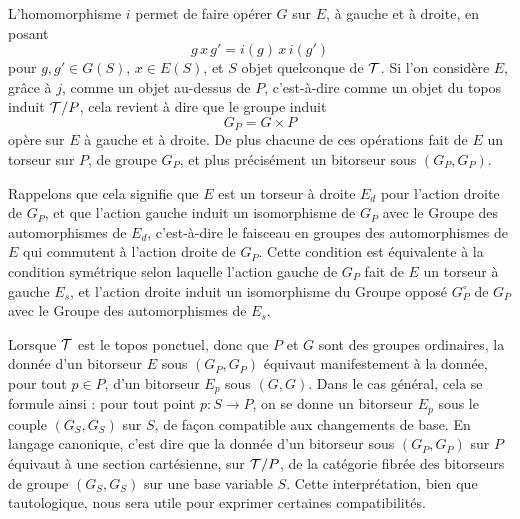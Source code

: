 \documentclass[11pt]{article}
\begin{document}
L'homomorphisme \(i\) permet de faire opérer \(G\) sur \(E\), à gauche et à droite, en posant
\[
  g\,x\,g'=i(g)\,x\,i(g')
\]
pour \(g,g'\in G(S)\), \(x\in E(S)\), et \(S\) objet quelconque de \(\mathcal T\).  Si l'on considère \(E\), grâce à \(j\), comme un objet au-dessus de \(P\), c'est-à-dire comme un objet du topos induit \(\mathcal T/P\), cela revient à dire que le groupe induit
\[
  G_P=G\times P
\]
opère sur \(E\) à gauche et à droite.  De plus chacune de ces opérations fait de \(E\) un torseur sur \(P\), de groupe \(G_P\), et plus précisément un bitorseur sous \((G_P,G_P)\).

Rappelons que cela signifie que \(E\) est un torseur à droite \(E_d\) pour l'action droite de \(G_P\), et que l'action gauche induit un isomorphisme de \(G_P\) avec le Groupe des automorphismes de \(E_d\), c'est-à-dire le faisceau en groupes des automorphismes de \(E\) qui commutent à l'action droite de \(G_P\).  Cette condition est équivalente à la condition symétrique selon laquelle l'action gauche de \(G_P\) fait de \(E\) un torseur à gauche \(E_s\), et l'action droite induit un isomorphisme du Groupe opposé \(G_P^\circ\) de \(G_P\) avec le Groupe des automorphismes de \(E_s\).

Lorsque \(\mathcal T\) est le topos ponctuel, donc que \(P\) et \(G\) sont des groupes ordinaires, la donnée d'un bitorseur \(E\) sous \((G_P,G_P)\) équivaut manifestement à la donnée, pour tout \(p\in P\), d'un bitorseur \(E_p\) sous \((G,G)\).  Dans le cas général, cela se formule ainsi : pour tout point \(p:S\to P\), on se donne un bitorseur \(E_p\) sous le couple \((G_S,G_S)\) sur \(S\), de façon compatible aux changements de base.  En langage canonique, c'est dire que la donnée d'un bitorseur sous \((G_P,G_P)\) sur \(P\) équivaut à une section cartésienne, sur \(\mathcal T/P\), de la catégorie fibrée des bitorseurs de groupe \((G_S,G_S)\) sur une base variable \(S\).  Cette interprétation, bien que tautologique, nous sera utile pour exprimer certaines compatibilités.
\end{document}
